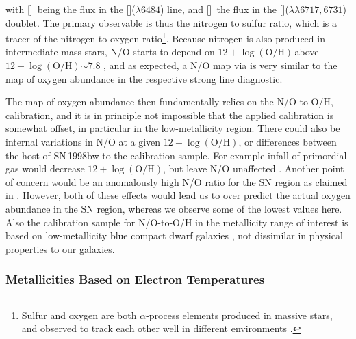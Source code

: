 \documentclass[traditabstract]{aa}
\newcommand{\oh}{$12+\log(\mathrm{O/H})$}
\newcommand{\sii}{[\ion{S}{ii}]}
\newcommand{\nii}{[\ion{N}{ii}]}
\begin{document}
with \nii\, being the flux in the \nii($\lambda6484$) line, and \sii\, the flux in the \sii($\lambda\lambda6717,6731$) doublet. The primary observable is thus the nitrogen to sulfur ratio, which is a tracer of the nitrogen to oxygen ratio\footnote{Sulfur and oxygen are both $\alpha$-process elements produced in massive stars, and observed to track each other well in different environments \citep[see e.g. Figure 6 in][]{2006A&A...448..955I}.}. Because nitrogen is also produced in intermediate mass stars, N/O starts to depend on \oh\,above \oh$\sim 7.8$ \citep[e.g.][]{1999ApJ...511..639I, 2013A&A...549A..25P, 2016A&A...595A..62P}, and as expected, a N/O map via \citet{2010ApJ...715L.128A} is very similar to the map of oxygen abundance in the respective strong line diagnostic. 

The map of oxygen abundance then fundamentally relies on the N/O-to-O/H, calibration, and it is in principle not impossible that the applied calibration is somewhat offset, in particular in the low-metallicity region. There could also be internal variations in N/O at a given \oh, or differences between the host of SN\,1998bw to the calibration sample. For example infall of primordial gas would decrease \oh, but leave N/O unaffected \citep{2016ApJ...823L..24K}. Another point of concern would be an anomalously high N/O ratio for the SN region as claimed in \citet{2006A&A...454..103H}. However, both of these effects would lead us to over predict the actual oxygen abundance in the SN region, whereas we observe some of the lowest values here. Also the calibration sample for N/O-to-O/H in the metallicity range of interest is based on low-metallicity blue compact dwarf galaxies \citep{1999ApJ...511..639I}, not dissimilar in physical properties to our galaxies. 
\subsubsection{Metallicities Based on Electron Temperatures}
\end{document}
